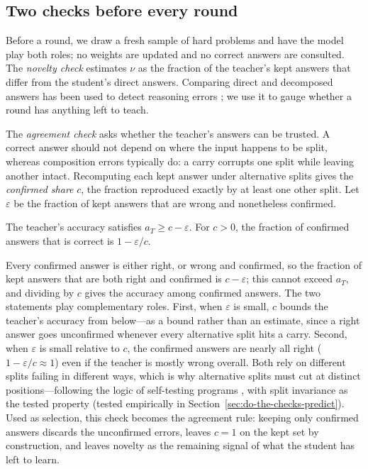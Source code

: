 \subsection{Two checks before every round}
\label{sec:two-questions}

Before a round, we draw a fresh sample of hard problems and have the model play
both roles; no weights are updated and no correct answers are consulted. The
\emph{novelty check} estimates $\nu$ as the fraction of the teacher's kept
answers that differ from the student's direct answers. Comparing direct and
decomposed answers has been used to detect reasoning errors
\citep{bottman2026operadic, yang2024decc}; we use it to gauge whether a
round has anything left to teach.

The \emph{agreement check} asks whether the teacher's answers can be trusted. A
correct answer should not depend on where the input happens to be split,
whereas composition errors typically do: a carry corrupts one split while
leaving another intact. Recomputing each kept answer under alternative splits
gives the \emph{confirmed share} $c$, the fraction reproduced exactly by at
least one other split. Let $\varepsilon$ be the fraction of kept answers that
are wrong and nonetheless confirmed.

\begin{proposition}
\label{prop:agreement}
The teacher's accuracy satisfies $a_T \ge c - \varepsilon$. For $c > 0$, the
fraction of confirmed answers that is correct is $1 - \varepsilon/c$.
\end{proposition}

Every confirmed answer is either right, or wrong and confirmed, so the fraction
of kept answers that are both right and confirmed is $c - \varepsilon$; this
cannot exceed $a_T$, and dividing by $c$ gives the accuracy among confirmed
answers. The two statements play complementary roles. First, when $\varepsilon$
is small, $c$ bounds the teacher's accuracy from below---as a bound rather than
an estimate, since a right answer goes unconfirmed whenever every alternative
split hits a carry. Second, when $\varepsilon$ is small relative to $c$, the
confirmed answers are nearly all right ($1 - \varepsilon/c \approx 1$) even if
the teacher is mostly wrong overall. Both rely on different splits failing in
different ways, which is why alternative splits must cut at distinct
positions---following the logic of self-testing programs
\citep{blum1993selftesting}, with split invariance as the tested property
(tested empirically in Section~\ref{sec:do-the-checks-predict}). Used as
selection, this check becomes the agreement rule: keeping only confirmed
answers discards the unconfirmed errors, leaves $c = 1$ on the kept set by
construction, and leaves novelty as the remaining signal of what the student
has left to learn.


